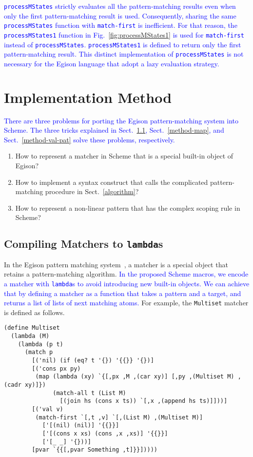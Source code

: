 \documentclass[acmlarge]{acmart}
\newcommand{\new}[1]{\textcolor{blue}{#1}}
\begin{document}
\new{
\texttt{processMStates} strictly evaluates all the pattern-matching results even when only the first pattern-matching result is used.
Consequently, sharing the same \texttt{processMStates} function with \texttt{match-first} is inefficient.
For that reason, the \texttt{processMStates1} function in Fig.~\ref{fig:processMStates1} is used for \texttt{match-first} instead of \texttt{processMStates}.
\texttt{processMStates1} is defined to return only the first pattern-matching result.
This distinct implementation of \lstinline{processMStates} is not necessary for the Egison language that adopt a lazy evaluation strategy.
}%

\section{Implementation Method}\label{method}

\new{
There are three problems for porting the Egison pattern-matching system into Scheme.
The three tricks explained in Sect.~\ref{method-matcher}, Sect.~\ref{method-map}, and Sect.~\ref{method-val-pat} solve these problems, respectively.
}%

\begin{enumerate}
\item How to represent a matcher in Scheme that is a special built-in object of Egison?
\item How to implement a syntax construct that calls the complicated pattern-matching procedure in Sect.~\ref{algorithm}?
\item How to represent a non-linear pattern that has the complex scoping rule in Scheme?
\end{enumerate}

\subsection{Compiling Matchers to \lstinline{lambda}s}\label{method-matcher}

In the Egison pattern matching system~\cite{egi2018aplas}, a matcher is a special object that retains a pattern-matching algorithm.
\new{
In the proposed Scheme macros, we encode a matcher with \texttt{lambda}s to avoid introducing new built-in objects.
We can achieve that by defining a matcher as a function that takes a pattern and a target, and returns a list of lists of next matching atoms.
}%
For example, the \lstinline{Multiset} matcher is defined as follows.

\begin{lstlisting}[language=egison]
(define Multiset
  (lambda (M)
    (lambda (p t)
      (match p
        [('nil) (if (eq? t '{}) '{{}} '{})]
        [('cons px py)
         (map (lambda (xy) `{[,px ,M ,(car xy)] [,py ,(Multiset M) ,(cadr xy)]})
              (match-all t (List M)
                [(join hs (cons x ts)) `[,x ,(append hs ts)]]))]
        [('val v)
         (match-first `[,t ,v] `[,(List M) ,(Multiset M)]
           ['[(nil) (nil)] '{{}}]
           ['[(cons x xs) (cons ,x ,xs)] '{{}}]
           ['[_ _] '{}))]
        [pvar `{{[,pvar Something ,t]}}]))))
\end{lstlisting}
\end{document}
